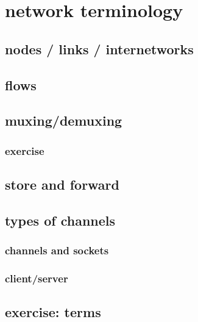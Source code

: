 
\section{network terminology}

\subsection{nodes / links / internetworks}



\subsection{flows}



\subsection{muxing/demuxing}


\subsubsection{exercise}


\subsection{store and forward}


\subsection{types of channels}



\subsubsection{channels and sockets}


\subsubsection{client/server}


\subsection{exercise: terms}


